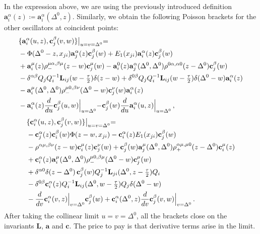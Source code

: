 In the expression above, we are using the previously introduced definition $\mathbf{a}_i^\alpha(z) \coloneq \mathbf{a}_i^\alpha(\Delta^0, z)$.
Similarly, we obtain the following Poisson brackets for the other oscillators at coincident points:
\begin{equation}
\begin{split}
&\{\mathbf{a}_i^\alpha(u,z), \mathbf{c}_j^\beta(v,w)\}\bigl|_{u=v=\Delta^0}=\\
&- \Phi(\Delta^0-z, x_{ji})   \mathbf{a}_j^\alpha(z) \mathbf{c}_j^\beta(w) + E_1(x_{ji}) \mathbf{a}_i^\alpha(z) \mathbf{c}_j^\beta(w)\\
&+\mathbf{a}_i^\mu(z) \rho_-^{\mu \alpha, \beta \mu}(z-w) \mathbf{c}_j^\mu(w)-  \mathbf{a}_i^0 (z)\mathbf{a}_j^\alpha(\Delta^0,\Delta^0) \rho^{0 \alpha, \alpha 0}(z-\Delta^0) \mathbf{c}_j^\beta(w)\\
&-\delta^{\alpha\beta} Q_j Q^{-1}_i  \mathbf{L}_{ij}(w-\tfrac{\tau}{2}) \delta(z-w)+\delta^{0\beta} Q_j Q^{-1}_i  \mathbf{L}_{ij}(w-\tfrac{\tau}{2}) \delta(\Delta^0-w)\mathbf{a}_i^\alpha(z)\\
&-\mathbf{a}_i^\mu(\Delta^0,\Delta^0) \rho_-^{\mu 0, \beta \nu}(\Delta^0-w) \mathbf{c}_j^\nu(w) \mathbf{a}_i^\alpha(z)\\
&- \mathbf{a}_i^\alpha(z) \frac{d}{du} \mathbf{c}_j^\beta(u,w)\Bigl|_{u=\Delta^0} - \mathbf{c}_j^\beta(w) \frac{d}{du} \mathbf{a}_i^\alpha(u,z)\Bigl|_{u=\Delta^0}  \, ,
\end{split}
\end{equation}
\begin{equation}
\begin{split}
&\{\mathbf{c}_i^\alpha(u,z),\mathbf{c}_j^\beta(v,w)\}\bigl|_{u=v=\Delta^0} =\\
&- \mathbf{c}_j^\alpha(z) \mathbf{c}_i^\beta(w)   \Phi(z-w, x_{ji}) - \mathbf{c}_i^\alpha(z) E_1(x_{ji})    \mathbf{c}_j^\beta(w) \\
&-\rho^{\alpha \mu, \beta \nu}(z-w)
\mathbf{c}_i^\mu(z) \mathbf{c}_j^\nu(w)+\mathbf{c}_j^\beta(w)  \mathbf{a}_j^\mu(\Delta^0,\Delta^0) \rho_+^{\alpha \mu, \mu 0}(z-\Delta^0) \mathbf{c}_i^\mu(z)  \\
&+\mathbf{c}_i^\alpha(z)  \mathbf{a}_i^\mu(\Delta^0,\Delta^0)  \rho_-^{\mu 0, \beta \mu}(\Delta^0-w) \mathbf{c}_j^\mu(w)\\
&+\delta^{\alpha0}  \delta(z-\Delta^0)  \, \mathbf{c}_j^\beta(w) Q^{-1}_j    \mathbf{L}_{ji}(\Delta^0, z-\tfrac{\tau}{2}) Q_i\\
&-\delta^{0\beta} \mathbf{c}_i^\alpha(z) Q^{-1}_i \mathbf{L}_{ij}(\Delta^0,w-\tfrac{\tau}{2}) Q_j \delta(\Delta^0-w)\\
&- \frac{d}{dv}\mathbf{c}_i^\alpha(v,z) \Bigl|_{v=\Delta^0} \mathbf{c}_j^\beta(w)+ \mathbf{c}_i^\alpha(\Delta^0,z) \frac{d}{dv}\mathbf{c}_j^\beta(v,w) \Bigl|_{v=\Delta^0}\,.
\end{split}
\end{equation}
After taking the collinear limit $u=v=\Delta^0$, all the brackets close on the invariants $\mathbf{L}$, $\mathbf{a}$ and $\mathbf{c}$. The price to pay is that derivative terms arise in the limit.

